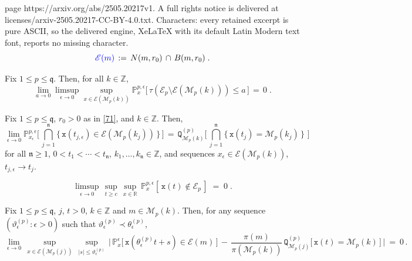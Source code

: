 \documentclass[10pt,a4paper]{amsart}
\newcommand{\bb}[1]{{\mathbb #1}}
\newcommand{\mc}[1]{{\mathcal #1}}
\newcommand{\mf}[1]{{\mathfrak #1}}
\newcommand{\ms}[1]{{\mathscr #1}}
\newcommand{\mtt}[1]{{\mathtt #1}}
\begin{document}
page https://arxiv.org/abs/2505.20217v1. A full rights notice is delivered at licenses/arxiv-2505.20217-CC-BY-4.0.txt. Characters: every retained excerpt is pure ASCII, so the delivered engine, XeLaTeX with its default Latin Modern text font, reports no missing character.
\begin{equation}
\label{71}
{\color{blue}\ms E(m)} \,:=\, N(m ,r_0)\,\cap\, B(m ,r_0)\;.
\end{equation}

\begin{corollary}
\label{l07}
Fix $1\le p\le \mf q$. Then, for all $k\in\bb Z$,
\begin{equation*}
\lim_{a \to 0} \limsup_{\epsilon \to 0} 
\sup_{x\in \ms E(\ms M_p(k))} 
\bb P^{p,\epsilon}_{x}\big[\, \tau(\ms E_p \setminus \ms E(\ms M_p(k)))
\le  a  \,\big] \,=\, 0\;.
\end{equation*}
\end{corollary}

\begin{proposition}
\label{l11}
Fix $1\le p\le \mf q$, $r_0>0$ as in \eqref{71}, and $k\in \bb Z$. Then,
\begin{equation*}
\lim_{\epsilon\rightarrow0}
\mathbb{P}_{x_\epsilon}^{p,\epsilon}
\Big[\, \bigcap_{j=1}^{{\mf n}}
\big \{\, \mtt x (t_{j,\epsilon} )
\in \mc E( \ms M_p(k_j))\, \big\} \, \Big]
\,=\, \mtt Q^{(p)}_{\ms M_p(k)}
\big[\, \bigcap_{j=1}^{{\mf n}}
\big\{ \, \mtt x (t_{j}) = \ms M_p(k_j) \, \} \, \, \big]
\end{equation*}
for all ${\mf n}\ge 1$, $0<t_{1}<\cdots<t_{{\mf n}}$,
$k_1, \dots, k_{\mf n} \in \bb Z$, and sequences
$x_\epsilon \in \mc E(\ms M_p(k))$, $t_{j,\epsilon} \to t_j$.
\end{proposition}

\begin{equation}
\label{33}
\limsup_{\epsilon\to0}\,
\sup_{t\ge c}\, \sup_{x\in \bb R}\,
\bb P_{x}^{p, \epsilon}    [\, \mtt x(t) \notin\ms E_p \, ] \;=\; 0\;.
\end{equation}

\begin{lemma}
\label{l36}
Fix $1\le p\le \mf q$, $j$, $t>0$, $k\in\bb Z$ and $m \in \ms M_p(k)$.
Then, for any sequence $(\vartheta^{(p)}_{\epsilon} :\epsilon>0)$ such
that $\vartheta^{(p)}_{\epsilon}\prec\theta_{\epsilon}^{(p)}$,
\begin{equation*}
\lim_{\epsilon\to 0}\, \sup_{x \in\mathcal{E}(\ms M_p(j))}\,
\sup_{|s|\le\vartheta^{(p)}_\epsilon}\,\Big|\,
\mathbb{P}_{x}^{\epsilon} \big[\,\mtt x(\theta_{\epsilon}^{(p)}t+s)
\in\mathcal{E}(m)\,\big] \,-\,
\frac{\pi (m)}{\pi(\ms M_p(k))}
\,\mtt {Q}_{\ms M_p(j)}^{(p)}\big[\, \mtt
x(t)= \ms M_p(k)\,\big]\,\Big|\ =\ 0\,. 
\end{equation*}
\end{lemma}
\end{document}
